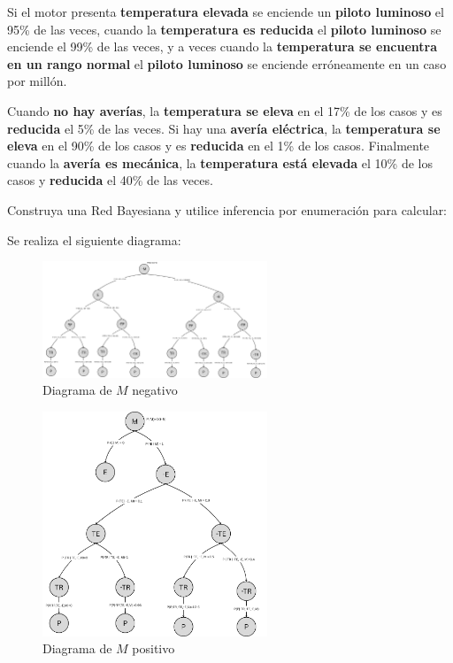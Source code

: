 \documentclass[11pt]{article}
\begin{document}
Si el motor presenta \textbf{temperatura elevada} se enciende un \textbf{piloto luminoso} el 95\% de las veces, cuando la \textbf{temperatura es reducida} el \textbf{piloto luminoso} se enciende el 99\% de las veces, y a veces cuando la \textbf{temperatura se encuentra en un rango normal} el \textbf{piloto luminoso} se enciende erróneamente en un caso por millón.

Cuando \textbf{no hay averías}, la \textbf{temperatura se eleva} en el 17\% de los casos y es \textbf{reducida} el 5\% de las veces. Si hay una \textbf{avería eléctrica}, la \textbf{temperatura se eleva} en el 90\% de los casos y es \textbf{reducida} en el 1\% de los casos. Finalmente cuando la \textbf{avería es mecánica}, la \textbf{temperatura está elevada} el 10\% de los casos y \textbf{reducida} el 40\% de las veces.

Construya una Red Bayesiana y utilice inferencia por enumeración para calcular:

Se realiza el siguiente diagrama:

\begin{figure}[H]
    \centering
    \includegraphics[width=0.6\textwidth]{M_negativo.png}
    \caption{Diagrama de $M$ negativo}
    \label{fig:m_negativo}
\end{figure}

\begin{figure}[H]
    \centering
    \includegraphics[width=0.6\textwidth]{M_positivo.png}
    \caption{Diagrama de $M$ positivo}
    \label{fig:m_positivo}
\end{figure}
\end{document}
